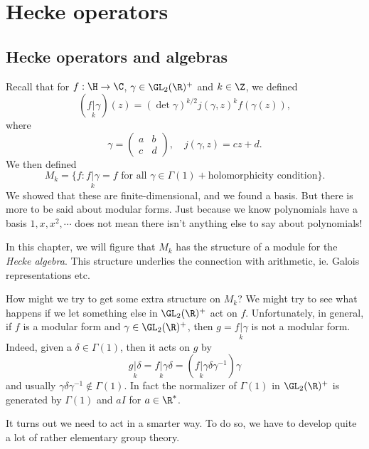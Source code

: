 \documentclass[a4paper]{article}
\begin{document}
\section{Hecke operators}
\subsection{Hecke operators and algebras}
Recall that for $f: \H \to \C$, $\gamma \in \GL_2(\R)^+$ and $k \in \Z$, we defined
\[
  (f\underset{k}{|} \gamma)(z) = (\det \gamma)^{k/2} j(\gamma, z)^k f(\gamma(z)),
\]
where
\[
  \gamma =
  \begin{pmatrix}
    a & b\\
    c & d
  \end{pmatrix},\quad j(\gamma, z) = cz + d.
\]
We then defined
\[
  M_k = \{f: f \underset{k}{|} \gamma = f\text{ for all }\gamma \in \Gamma(1) + \text{holomorphicity condition}\}.
\]
We showed that these are finite-dimensional, and we found a basis. But there is more to be said about modular forms. Just because we know polynomials have a basis $1, x, x^2, \cdots$ does not mean there isn't anything else to say about polynomials!

In this chapter, we will figure that $M_k$ has the structure of a module for the \emph{Hecke algebra}. This structure underlies the connection with arithmetic, ie. Galois representations etc.

How might we try to get some extra structure on $M_k$? We might try to see what happens if we let something else in $\GL_2(\R)^+$ act on $f$. Unfortunately, in general, if $f$ is a modular form and $\gamma \in \GL_2(\R)^+$, then $g = f \underset{k}{|} \gamma$ is not a modular form. Indeed, given a $\delta\in \Gamma(1)$, then it acts on $g$ by
\[
  g\underset{k}{|} \delta = f\underset{k}{|} \gamma\delta = (f\underset{k}{|} \gamma \delta \gamma^{-1})\gamma
\]
and usually $\gamma \delta \gamma^{-1} \not \in \Gamma(1)$. In fact the normalizer of $\Gamma(1)$ in $\GL_2(\R)^+$ is generated by $\Gamma(1)$ and $aI$ for $a \in \R^*$.

It turns out we need to act in a smarter way. To do so, we have to develop quite a lot of rather elementary group theory.
\end{document}
